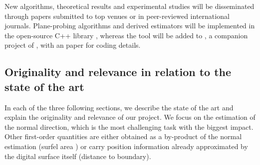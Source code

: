 New algorithms, theoretical results and experimental studies will be disseminated through papers submitted to
top venues or in peer-reviewed international journals. Plane-probing algorithms and derived estimators
will be implemented in the open-source C++ library {\DGtal}, whereas the tool will be added to {\DGtalTools},
a companion project of {\DGtal}, with an {\IPOL} paper for coding details.  

 


\subsection{Originality and relevance in relation to the state of the art}
\label{sec:art}


In each of the three following sections, we describe the state of the art and explain the originality and relevance of our project.
We focus on the estimation of the normal direction, which is the most challenging task with the biggest impact. 
Other first-order quantities are either obtained as a by-product of the normal estimation (\eg surfel area \cite{Lachaud2016})
or carry position information already approximated by the digital surface itself (\eg distance to boundary).

